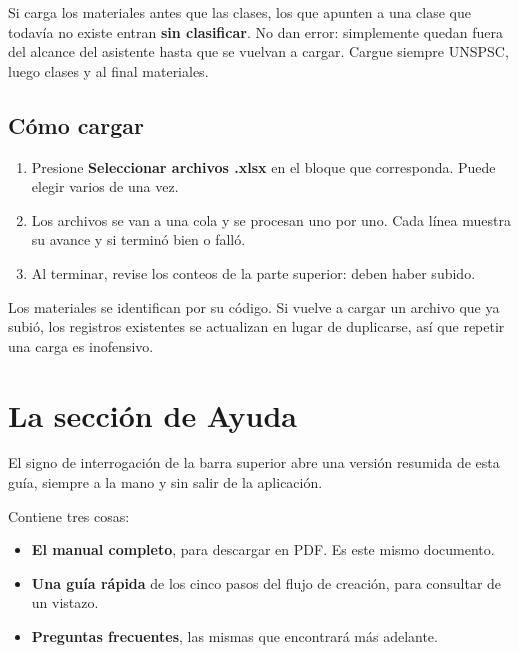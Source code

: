 \begin{aviso}
Si carga los materiales antes que las clases, los que apunten a una clase que
todavía no existe entran \textbf{sin clasificar}. No dan error: simplemente
quedan fuera del alcance del asistente hasta que se vuelvan a cargar. Cargue
siempre UNSPSC, luego clases y al final materiales.
\end{aviso}

\subsection{Cómo cargar}

\begin{enumerate}[leftmargin=*, itemsep=3pt]
  \item Presione \textbf{Seleccionar archivos .xlsx} en el bloque que
        corresponda. Puede elegir varios de una vez.
  \item Los archivos se van a una cola y se procesan uno por uno. Cada línea
        muestra su avance y si terminó bien o falló.
  \item Al terminar, revise los conteos de la parte superior: deben haber
        subido.
\end{enumerate}

\begin{nota}
Los materiales se identifican por su código. Si vuelve a cargar un archivo que
ya subió, los registros existentes se actualizan en lugar de duplicarse, así
que repetir una carga es inofensivo.
\end{nota}

\newpage
\section{La sección de Ayuda}

El signo de interrogación de la barra superior abre una versión resumida de
esta guía, siempre a la mano y sin salir de la aplicación.


Contiene tres cosas:

\begin{itemize}[leftmargin=*, itemsep=3pt]
  \item \textbf{El manual completo}, para descargar en PDF. Es este mismo
        documento.
  \item \textbf{Una guía rápida} de los cinco pasos del flujo de creación, para
        consultar de un vistazo.
  \item \textbf{Preguntas frecuentes}, las mismas que encontrará más adelante.
\end{itemize}

